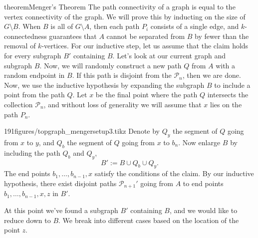 \begin{doubledpage}{theorem}{Menger's Theorem}{
	The path connectivity of a graph is equal to the vertex connectivity of the graph.  }
We will prove this by inducting  on the size of $G\setminus B$. When $B$ is all of $G\setminus A$, then each path $P_i$ consists of a single edge, and $k$-connectedness guarantees that $A$ cannot be separated from $B$ by fewer than the removal of $k$-vertices.
For our inductive step, let us assume that the claim holds for every subgraph $B'$ containing $B$.  Let's look at our current graph and subgraph $B$. 
Now, we will randomly construct a new path $Q$ from $A$ with a  random endpoint in $B$.
If this path is disjoint from the $\mathcal P_n$, then we are done.
Now, we use the inductive hypothesis by expanding the subgraph $B$ to include a point from the path $Q$. Let $x$ be the final point where the path $Q$ intersects the collection $\mathcal P_n$, and without loss of generality we will assume that $x$ lies on the path $P_n$.
\begin{paragraphfigureenv}{191figures/topgraph_mengersetup3.tikz}
     Denote by $Q_y$ the segment of $Q$ going from $x$ to $y$, and $Q_b$ the segment of $Q$ going from $x$ to $b_n$.  Now  enlarge $B$ by including the path $Q_b$ and $Q_y$, 
\[B':= B\cup Q_b\cup Q_y.\]
The end points $b_1, \ldots, b_{n-1}, x$ satisfy the conditions of the claim.  By our inductive hypothesis, there exist disjoint paths $\mathcal P_{n+1}'$ going from $A$ to end points $b_1, \ldots, b_{n-1}, x, z$ in $B'$. 
\end{paragraphfigureenv}

At this point we've found a subgraph $B'$ containing $B$, and we would like to reduce down to $B$.
We break into different cases based on the location of the point $z$. 


\end{doubledpage}

